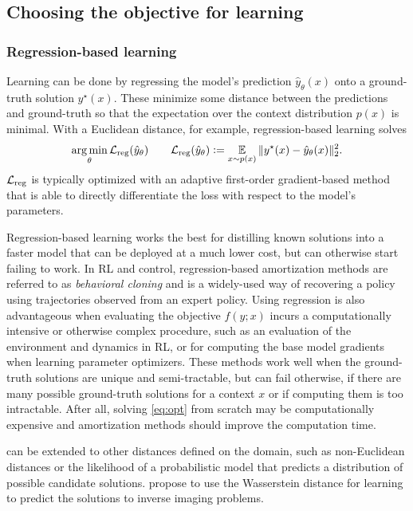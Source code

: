 \subsection{Choosing the objective for learning}
\subsubsection{Regression-based learning}
\label{sec:learning:reg}
Learning can be done by regressing the
model's prediction $\hat y_\theta(x)$ onto a
ground-truth solution $y^\star(x)$.
These minimize some distance between the predictions
and ground-truth so that the expectation over
the context distribution $p(x)$ is minimal.
With a Euclidean distance, for example,
regression-based learning solves
\begin{equation}
  \operatorname*{arg\,min}_\theta {\mathcal{L}}_{\rm reg}(\hat y_\theta) \qquad
  {\mathcal{L}}_{\rm reg}(\hat y_\theta) \vcentcolon=
  \operatorname*{\mathbb{E}}_{x \sim p(x)} \|y^\star(x) - \hat y_\theta(x) \|_2^2.
\label{eq:reg-loss}
\end{equation}
${\mathcal{L}}_{\rm reg}$ is typically optimized with an adaptive first-order
gradient-based method that is able to directly differentiate
the loss with respect to the model's parameters.

Regression-based learning works the best for distilling
known solutions into a faster model that can be deployed
at a much lower cost, but can otherwise start failing to work.
In RL and control, regression-based amortization
methods are referred to as \emph{behavioral cloning} and
is a widely-used way of recovering a policy using
trajectories observed from an expert policy.
Using regression is also advantageous when evaluating
the objective $f(y;x)$ incurs a computationally intensive
or otherwise complex procedure, such as an evaluation of
the environment and dynamics in RL, or for
computing the base model gradients when learning parameter optimizers.
These methods work well when the ground-truth solutions
are unique and semi-tractable, but can fail otherwise,
\ie if there are many possible ground-truth
solutions for a context $x$ or if computing them
is too intractable.
After all, solving \cref{eq:opt} from scratch may be
computationally expensive and amortization methods
should improve the computation time.

\begin{remark}
   can be extended to other distances
  defined on the domain, such as non-Euclidean distances
  or the likelihood of a probabilistic model that predicts
  a distribution of possible candidate solutions.
  \citet{adler2017learning} propose to use the Wasserstein
  distance for learning to predict the solutions to
  inverse imaging problems.
\end{remark}

